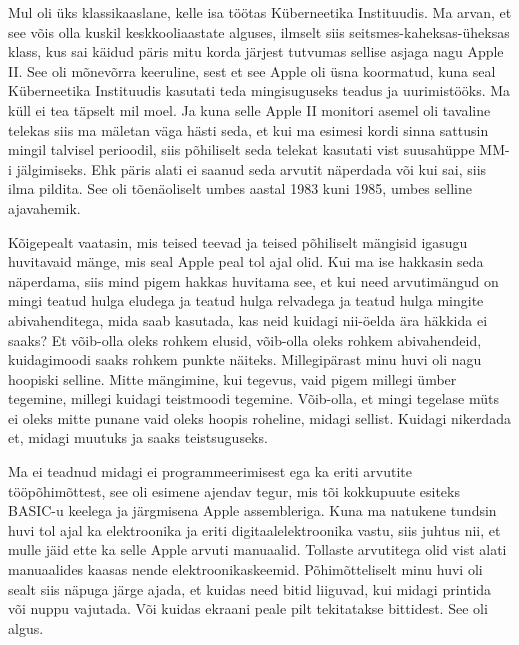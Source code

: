 

Mul oli üks klassikaaslane, kelle isa töötas Küberneetika 
Instituudis. Ma arvan, et see võis olla kuskil 
keskkooliaastate alguses, ilmselt siis seitsmes-kaheksas-üheksas klass, kus sai 
käidud päris mitu korda järjest tutvumas sellise asjaga nagu Apple 
II. See oli  mõnevõrra keeruline, sest et see Apple oli 
üsna koormatud, kuna seal Küberneetika Instituudis  kasutati teda mingisuguseks 
teadus ja uurimistööks. Ma küll ei tea täpselt mil moel. Ja kuna selle Apple II 
monitori asemel oli tavaline telekas siis ma mäletan väga hästi seda, et kui ma 
esimesi kordi sinna sattusin mingil talvisel perioodil, siis põhiliselt seda 
telekat kasutati vist suusahüppe MM-i jälgimiseks. Ehk päris alati ei saanud 
seda arvutit näperdada või kui sai, siis ilma pildita. See oli  tõenäoliselt 
umbes aastal 1983 kuni 1985, umbes selline ajavahemik. 


Kõigepealt vaatasin, mis teised teevad ja teised põhiliselt mängisid igasugu 
huvitavaid mänge, mis seal Apple peal tol ajal olid. Kui ma ise hakkasin seda 
näperdama, siis mind pigem hakkas huvitama see, et kui need arvutimängud on 
mingi teatud hulga eludega ja teatud hulga relvadega ja teatud hulga mingite 
abivahenditega, mida saab kasutada, kas neid kuidagi nii-öelda ära häkkida ei 
saaks? Et võib-olla oleks rohkem elusid,  võib-olla oleks rohkem abivahendeid, 
kuidagimoodi saaks rohkem punkte näiteks. Millegipärast minu huvi oli nagu 
hoopiski selline. Mitte  mängimine, kui tegevus, vaid pigem millegi ümber 
tegemine, millegi kuidagi teistmoodi tegemine. Võib-olla, et mingi tegelase 
müts ei oleks mitte punane vaid oleks hoopis roheline, midagi sellist. Kuidagi  
nikerdada  et, midagi muutuks ja saaks teistsuguseks. 

Ma ei teadnud midagi ei programmeerimisest ega ka eriti arvutite 
tööpõhimõttest, see oli  esimene ajendav tegur, mis tõi kokkupuute esiteks 
BASIC-u keelega ja järgmisena Apple 
assembleriga. Kuna ma natukene tundsin huvi tol ajal ka 
elektroonika ja eriti digitaalelektroonika vastu, siis juhtus nii, et mulle 
jäid ette ka selle Apple arvuti manuaalid. Tollaste arvutitega olid vist alati 
manuaalides kaasas nende elektroonikaskeemid. Põhimõtteliselt minu huvi oli 
sealt siis  näpuga järge ajada,  et kuidas need bitid liiguvad, kui midagi 
printida või nuppu vajutada. Või kuidas ekraani peale pilt tekitatakse 
bittidest. See oli algus.

